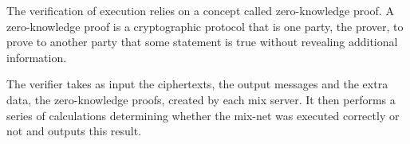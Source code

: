 
The verification of execution relies on a concept called
zero-knowledge proof. A zero-knowledge proof is a cryptographic
protocol that is one party, the prover, to prove to another party that
some statement is true without revealing additional information.

The verifier takes as input the ciphertexts, the output messages and
the extra data, the zero-knowledge proofs, created by each mix
server. It then performs a series of calculations determining whether
the mix-net was executed correctly or not and outputs this result.

\vspace{14pt}

\begin{center}
\end{center}

